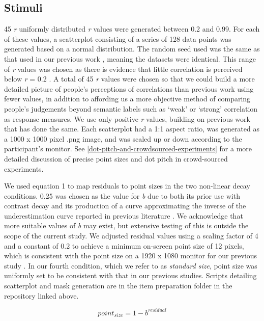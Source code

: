 \documentclass{vgtc}                          %
\begin{document}
\hypertarget{stimuli}{%
\subsection{Stimuli}\label{stimuli}}

45 \emph{r} uniformly distributed \emph{r} values were generated between 0.2 and 0.99.
For each of these values, a scatterplot consisting of a series of 128 data points
was generated based on a normal distribution. The random seed used was the same
as that used in our previous work \cite{strain_2023}, meaning the datasets were
identical. This range of \emph{r} values was chosen as there is evidence
that little correlation is perceived below \emph{r} = 0.2 \cite{strahan_1978, bobko_1979, cleveland_1982}.
A total of 45 \emph{r} values were chosen so that we could build a more detailed picture
of people's perceptions of correlations than previous work using fewer values,
in addition to affording us a more objective method of comparing people's judgements
beyond semantic labels such as `weak' or `strong' correlation as response measures.
We use only positive \emph{r} values, building on previous work that has done the same.
Each scatterplot had a 1:1 aspect ratio, was generated as a 1000 x 1000 pixel .png image, and was
scaled up or down according to the participant's monitor. See
\autoref{dot-pitch-and-crowdsourced-experiments} for a more detailed discussion of
precise point sizes and dot pitch in crowd-sourced experiments.

We used equation 1 to map residuals
to point sizes in the two non-linear decay conditions. 0.25 was chosen as the
value for \emph{b} due to both its prior use with contrast decay \cite{strain_2023} and its
production of a curve approximating the inverse of the underestimation curve reported
in previous literature \cite{rensink_2017}. We acknowledge that more suitable values of
\emph{b} may exist, but extensive testing of this is outside the scope of the current study.
We adjusted residual values using a scaling factor of 4 and a
constant of 0.2 to achieve a minimum on-screen point size of 12 pixels, which
is consistent with the point size on a 1920 x 1080 monitor for our previous study
\cite{strain_2023}. In our fourth condition,
which we refer to as \emph{standard size}, point size was uniformly
set to be consistent with that in our previous
studies. Scripts detailing scatterplot and mask generation are in the item
preparation folder in the repository linked above.

\begin{equation}
  point_{size} = 1 - b^{residual}
\end{equation}
\end{document}
